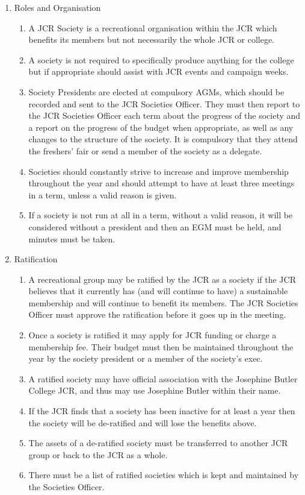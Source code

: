 \begin{enumerate}
    \item Roles and Organisation
    \begin{enumerate}
        \item A JCR Society is a recreational organisation within the JCR which benefits its members but not necessarily the whole JCR or college.
        \item A society is not required to specifically produce anything for the college but if appropriate should assist with JCR events and campaign weeks.
        \item Society Presidents are elected at compulsory AGMs, which should be recorded and sent to the JCR Societies Officer. They must then report to the JCR Societies Officer each term about the progress of the society and a report on the progress of the budget when appropriate, as well as any changes to the structure of the society. It is compulsory that they attend the freshers’ fair or send a member of the society as a delegate.
        \item Societies should constantly strive to increase and improve membership throughout the year and should attempt to have at least three meetings in a term, unless a valid reason is given.
        \item If a society is not run at all in a term, without a valid reason, it will be considered without a president and then an EGM must be held, and minutes must be taken.
    \end{enumerate}
    \item Ratification
    \begin{enumerate}
        \item A recreational group may be ratified by the JCR as a society if the JCR believes that it currently has (and will continue to have) a sustainable membership and will continue to benefit its members. The JCR Societies Officer must approve the ratification before it goes up in the meeting.
        \item Once a society is ratified it may apply for JCR funding or charge a membership fee. Their budget must then be maintained throughout the year by the society president or a member of the society’s exec.
        \item A ratified society may have official association with the Josephine Butler College JCR, and thus may use Josephine Butler within their name.
        \item If the JCR finds that a society has been inactive for at least a year then the society will be de-ratified and will lose the benefits above.
        \item The assets of a de-ratified society must be transferred to another JCR group or back to the JCR as a whole.
        \item There must be a list of ratified societies which is kept and maintained by the Societies Officer.
    \end{enumerate}
\end{enumerate}


